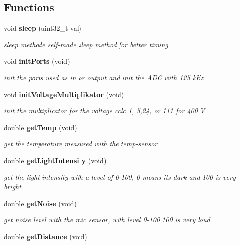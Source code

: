 \subsection*{\-Functions}
\begin{DoxyCompactItemize}
\item 
void {\bf sleep} (uint32\-\_\-t val)
\begin{DoxyCompactList}\small\item\em sleep methode self-\/made sleep method for better timing \end{DoxyCompactList}\item 
void {\bf init\-Ports} (void)\label{group__main_gaca4002ebd1dcbb1eff2ec63ee924892f}

\begin{DoxyCompactList}\small\item\em init the ports used as in or output and init the \-A\-D\-C with 125 k\-Hz \end{DoxyCompactList}\item 
void {\bf init\-Voltage\-Multiplikator} (void)\label{group__main_gacb3e16f99a51bb18c29e0668a8b0a75d}

\begin{DoxyCompactList}\small\item\em init the multiplicator for the voltage calc 1, 5,24, or 111 for 400 \-V \end{DoxyCompactList}\item 
double {\bf get\-Temp} (void)\label{group__main_ga11287b16260f611508b59bc017646b8b}

\begin{DoxyCompactList}\small\item\em get the temperature measured with the temp-\/sensor \end{DoxyCompactList}\item 
double {\bf get\-Light\-Intensity} (void)\label{group__main_ga2c557028dbc226ddcf2e0a7957178c32}

\begin{DoxyCompactList}\small\item\em get the light intensity with a level of 0-\/100, 0 means its dark and 100 is very bright \end{DoxyCompactList}\item 
double {\bf get\-Noise} (void)\label{group__main_gae80c6f2768f1758503261fbc18ee9eb7}

\begin{DoxyCompactList}\small\item\em get noise level with the mic sensor, with level 0-\/100 100 is very loud \end{DoxyCompactList}\item 
double {\bf get\-Distance} (void)\label{group__main_ga9d5a721bb90868a091edb6940bd7eb8d}


\end{DoxyCompactItemize}
